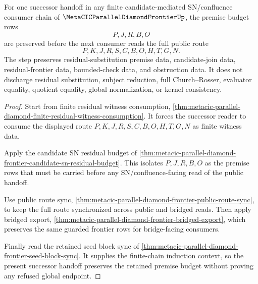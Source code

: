 \begin{theorem}
\label{thm:metacic-parallel-diamond-frontier-retained-premise-induction-step}
For one successor handoff in any finite candidate-mediated SN/confluence consumer chain of $\MetaCICParallelDiamondFrontierUp$, the premise budget rows
$$
P,J,R,B,O
$$
are preserved before the next consumer reads the full public route
$$
P,K,J,R,S,C,B,O,H,T,G,N.
$$
The step preserves residual-substitution premise data, candidate-join data, residual-frontier data, bounded-check data, and obstruction data. It does not discharge residual substitution, subject reduction, full Church--Rosser, evaluator equality, quotient equality, global normalization, or kernel consistency.
\end{theorem}
\begin{proof}
Start from finite residual witness consumption, \autoref{thm:metacic-parallel-diamond-finite-residual-witness-consumption}. It forces the successor reader to consume the displayed route $P,K,J,R,S,C,B,O,H,T,G,N$ as finite witness data.

Apply the candidate SN residual budget of \autoref{thm:metacic-parallel-diamond-frontier-candidate-sn-residual-budget}. This isolates $P,J,R,B,O$ as the premise rows that must be carried before any SN/confluence-facing read of the public handoff.

Use public route sync, \autoref{thm:metacic-parallel-diamond-frontier-public-route-sync}, to keep the full route synchronized across public and bridged reads. Then apply bridged export, \autoref{thm:metacic-parallel-diamond-frontier-bridged-export}, which preserves the same guarded frontier rows for bridge-facing consumers.

Finally read the retained seed block sync of \autoref{thm:metacic-parallel-diamond-frontier-seed-block-sync}. It supplies the finite-chain induction context, so the present successor handoff preserves the retained premise budget without proving any refused global endpoint.
\end{proof}


